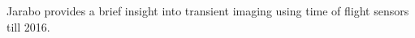Jarabo \etal \cite{jarabo2017recent} provides a brief insight into transient imaging using time of flight sensors till 2016.